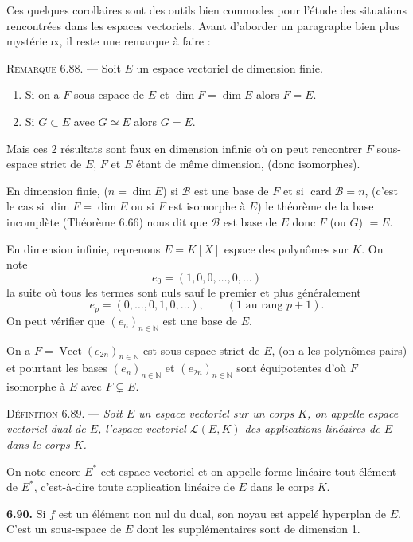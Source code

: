 Ces quelques corollaires sont des outils bien commodes pour l'étude des situations rencontrées dans les espaces vectoriels. Avant d'aborder un paragraphe bien plus mystérieux, il reste une remarque à faire :

\medskip\noindent\textsc{Remarque 6.88.} --- Soit $E$ un espace vectoriel de dimension finie.
\begin{enumerate}[label=\arabic*),leftmargin=2.1em]
\item Si on a $F$ sous-espace de $E$ et $\dim F=\dim E$ alors $F=E$.
\item Si $G\subset E$ avec $G\simeq E$ alors $G=E$.
\end{enumerate}
Mais ces 2 résultats sont faux en dimension infinie où on peut rencontrer $F$ sous-espace strict de $E$, $F$ et $E$ étant de même dimension, (donc isomorphes).

En dimension finie, ($n=\dim E$) si $\mathcal B$ est une base de $F$ et si $\operatorname{card}\mathcal B=n$, (c'est le cas si $\dim F=\dim E$ ou si $F$ est isomorphe à $E$) le théorème de la base incomplète (Théorème 6.66) nous dit que $\mathcal B$ est base de $E$ donc $F$ (ou $G$) $=E$.

En dimension infinie, reprenons $E=K[X]$ espace des polynômes sur $K$. On note
\[
e_0=(1,0,0,\ldots,0,\ldots)
\]
la suite où tous les termes sont nuls sauf le premier et plus généralement
\[
e_p=(0,\ldots,0,1,0,\ldots),\qquad(1\text{ au rang }p+1).
\]
On peut vérifier que $(e_n)_{n\in\mathbb N}$ est une base de $E$.

On a $F=\operatorname{Vect}(e_{2n})_{n\in\mathbb N}$ est sous-espace strict de $E$, (on a les polynômes pairs) et pourtant les bases $(e_n)_{n\in\mathbb N}$ et $(e_{2n})_{n\in\mathbb N}$ sont équipotentes d'où $F$ isomorphe à $E$ avec $F\subsetneq E$.



\medskip\noindent\textsc{Définition 6.89.} --- \emph{Soit $E$ un espace vectoriel sur un corps $K$, on appelle espace vectoriel dual de $E$, l'espace vectoriel $\mathcal L(E,K)$ des applications linéaires de $E$ dans le corps $K$.}

On note encore $E^*$ cet espace vectoriel et on appelle forme linéaire tout élément de $E^*$, c'est-à-dire toute application linéaire de $E$ dans le corps $K$.

\medskip\noindent\textbf{6.90.} Si $f$ est un élément non nul du dual, son noyau est appelé hyperplan de $E$. C'est un sous-espace de $E$ dont les supplémentaires sont de dimension 1.

